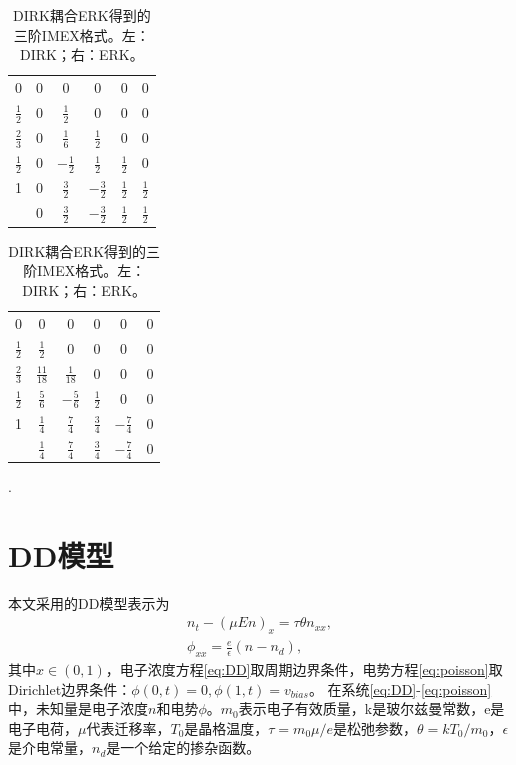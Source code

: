\begin{table}
	\centering
	\begin{minipage}{0.45\linewidth}
		\centering
		\begin{tabular}{c|ccccc}
			0             & 0 & 0              & 0              & 0             & 0             \\
			$\frac{1}{2}$ & 0 & $\frac{1}{2}$  & 0              & 0             & 0             \\
			$\frac{2}{3}$ & 0 & $\frac{1}{6}$  & $\frac{1}{2}$  & 0             & 0             \\
			$\frac{1}{2}$ & 0 & $-\frac{1}{2}$ & $\frac{1}{2}$  & $\frac{1}{2}$ & 0             \\
			1             & 0 & $\frac{3}{2}$  & $-\frac{3}{2}$ & $\frac{1}{2}$ & $\frac{1}{2}$ \\
			\hline
			              & 0 & $\frac{3}{2}$  & $-\frac{3}{2}$ & $\frac{1}{2}$ & $\frac{1}{2}$
		\end{tabular}
	\end{minipage}
	\begin{minipage}{0.45\linewidth}
		\centering
		\begin{tabular}{c|ccccc}
			0             & 0               & 0              & 0             & 0              & 0 \\
			$\frac{1}{2}$ & $\frac{1}{2}$   & 0              & 0             & 0              & 0 \\
			$\frac{2}{3}$ & $\frac{11}{18}$ & $\frac{1}{18}$ & 0             & 0              & 0 \\
			$\frac{1}{2}$ & $\frac{5}{6}$   & $-\frac{5}{6}$ & $\frac{1}{2}$ & 0              & 0 \\
			1             & $\frac{1}{4}$   & $\frac{7}{4}$  & $\frac{3}{4}$ & $-\frac{7}{4}$ & 0 \\
			\hline
			              & $\frac{1}{4}$   & $\frac{7}{4}$  & $\frac{3}{4}$ & $-\frac{7}{4}$ & 0
		\end{tabular}.
	\end{minipage}
	\caption{DIRK耦合ERK得到的三阶IMEX格式。左：DIRK；右：ERK。}
	\label{tab:IMEX:3}
\end{table}
\section{DD模型}

本文采用的DD模型表示为
\begin{align}
	n_t - (\mu En)_x = \tau \theta n_{xx}, \label{eq:DD} \\
	\phi_{xx} = \frac{e}{\epsilon}(n - n_d),  \label{eq:poisson}
\end{align}
其中$x\in(0,1)$，电子浓度方程\eqref{eq:DD}取周期边界条件，电势方程\eqref{eq:poisson}取Dirichlet边界条件：$\phi(0,t) = 0, \phi(1,t) = v_{bias}$。
在系统\eqref{eq:DD}-\eqref{eq:poisson}中，未知量是电子浓度$n$和电势$\phi$。$m_0$表示电子有效质量，k是玻尔兹曼常数，e是电子电荷，$\mu$代表迁移率，$T_0$是晶格温度，$\tau = m_0 \mu/e$是松弛参数，$\theta = kT_0/m_0$，$\epsilon$是介电常量，$n_d$是一个给定的掺杂函数。

